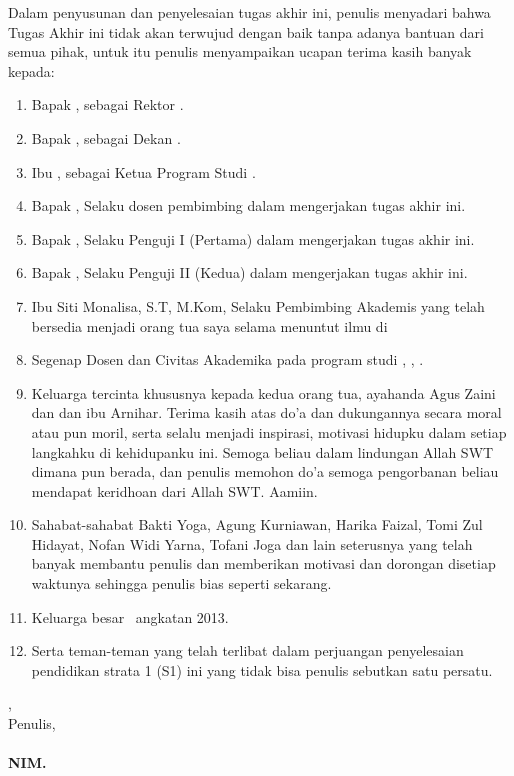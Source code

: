 Dalam penyusunan dan penyelesaian tugas akhir ini, penulis menyadari bahwa Tugas Akhir ini tidak akan terwujud dengan baik tanpa adanya bantuan dari semua pihak, untuk itu penulis menyampaikan ucapan terima kasih banyak kepada:
\begin{enumerate}
	\item Bapak \rektor, sebagai Rektor \universitas. 
	\item Bapak \dekan, sebagai Dekan \fakultas. 
	\item Ibu \kaprodi, sebagai Ketua Program Studi \programStudi.
	\item Bapak \pembimbingpertama, Selaku dosen pembimbing dalam mengerjakan tugas akhir ini.
	\item Bapak \pengujipertama, Selaku Penguji I (Pertama) dalam mengerjakan tugas akhir ini.
	\item Bapak \pengujikedua, Selaku Penguji II (Kedua) dalam mengerjakan tugas akhir ini.
	
	\item	Ibu Siti Monalisa, S.T, M.Kom, Selaku Pembimbing Akademis yang telah bersedia menjadi orang tua saya selama menuntut ilmu di \universitas
	\item	Segenap Dosen dan Civitas Akademika pada program studi \programStudi, \fakultas, \universitas.
	\item	Keluarga tercinta khususnya kepada kedua orang tua, ayahanda Agus Zaini dan dan ibu Arnihar. Terima kasih atas do’a dan dukungannya secara moral atau pun moril, serta selalu menjadi inspirasi, motivasi hidupku dalam setiap langkahku di kehidupanku ini. Semoga beliau dalam lindungan Allah SWT dimana pun berada, dan penulis memohon do’a semoga pengorbanan beliau mendapat keridhoan dari Allah SWT. Aamiin.
	\item	Sahabat-sahabat Bakti Yoga, Agung Kurniawan, Harika Faizal, Tomi Zul Hidayat, Nofan Widi Yarna, Tofani Joga dan lain seterusnya yang telah banyak membantu penulis dan memberikan motivasi dan dorongan disetiap waktunya sehingga penulis bias seperti sekarang.
	\item	Keluarga besar \programStudi \ angkatan 2013.
	\item	Serta teman-teman yang telah terlibat dalam perjuangan penyelesaian pendidikan strata 1 (S1) ini yang tidak bisa penulis sebutkan satu persatu.
	
\end{enumerate}




\vspace*{0.1cm}

\begin{flushright}
\kota, \tanggalPersetujuan\\
Penulis,\\
\vspace{3cm}
\textbf{\underline{\penulis}\\
NIM. \nim}

\end{flushright}
